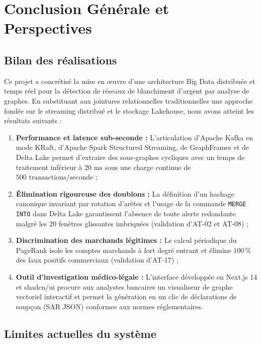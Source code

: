 
\chapter{Conclusion Générale et Perspectives}
\label{ch:conclusion}

\section{Bilan des réalisations}

Ce projet a concrétisé la mise en œuvre d'une architecture Big Data distribuée et temps réel pour la détection de réseaux de blanchiment d'argent par analyse de graphes. En substituant aux jointures relationnelles traditionnelles une approche fondée sur le streaming distribué et le stockage Lakehouse, nous avons atteint les résultats suivants :
\begin{enumerate}
    \item \textbf{Performance et latence sub-seconde :} L'articulation d'Apache Kafka en mode KRaft, d'Apache Spark Structured Streaming, de GraphFrames et de Delta Lake permet d'extraire des sous-graphes cycliques avec un temps de traitement inférieur à $20\text{ ms}$ sous une charge continue de $500\text{ transactions/seconde}$ ;
    \item \textbf{Élimination rigoureuse des doublons :} La définition d'un hachage canonique invariant par rotation d'arêtes et l'usage de la commande \texttt{MERGE INTO} dans Delta Lake garantissent l'absence de toute alerte redondante malgré les 20 fenêtres glissantes imbriquées (validation d'AT-02 et AT-08) ;
    \item \textbf{Discrimination des marchands légitimes :} Le calcul périodique du PageRank isole les comptes marchands à fort degré entrant et élimine $100\,\%$ des faux positifs commerciaux (validation d'AT-17) ;
    \item \textbf{Outil d'investigation médico-légale :} L'interface développée en Next.js 14 et shadcn/ui procure aux analystes bancaires un visualiseur de graphe vectoriel interactif et permet la génération en un clic de déclarations de soupçon (SAR JSON) conformes aux normes réglementaires.
\end{enumerate}

\section{Limites actuelles du système}

